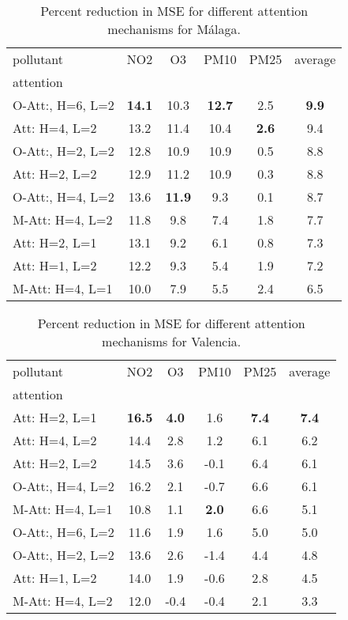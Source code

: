 \begin{table}
\begin{center}
\begin{tabular}{lccccc}
\toprule
pollutant & NO2 & O3 & PM10 & PM25 & average \\
attention &  &  &  &  &  \\
\midrule
O-Att:, H=6, L=2 & \textbf{14.1} & 10.3 & \textbf{12.7} & 2.5 & \textbf{9.9} \\
Att: H=4, L=2 & 13.2 & 11.4 & 10.4 & \textbf{2.6} & 9.4 \\
O-Att:, H=2, L=2 & 12.8 & 10.9 & 10.9 & 0.5 & 8.8 \\
Att: H=2, L=2 & 12.9 & 11.2 & 10.9 & 0.3 & 8.8 \\
O-Att:, H=4, L=2 & 13.6 & \textbf{11.9} & 9.3 & 0.1 & 8.7 \\
M-Att: H=4, L=2 & 11.8 & 9.8 & 7.4 & 1.8 & 7.7 \\
Att: H=2, L=1 & 13.1 & 9.2 & 6.1 & 0.8 & 7.3 \\
Att: H=1, L=2 & 12.2 & 9.3 & 5.4 & 1.9 & 7.2 \\
M-Att: H=4, L=1 & 10.0 & 7.9 & 5.5 & 2.4 & 6.5 \\
\bottomrule
\end{tabular}
\end{center}
\caption{Percent reduction in MSE for different attention mechanisms for Málaga.}
\label{tab:MSEGainByCityMalaga}
\end{table}



\begin{table}
\begin{center}
\begin{tabular}{lccccc}
\toprule
pollutant & NO2 & O3 & PM10 & PM25 & average \\
attention &  &  &  &  &  \\
\midrule
Att: H=2, L=1 & \textbf{16.5} & \textbf{4.0} & 1.6 & \textbf{7.4} & \textbf{7.4} \\
Att: H=4, L=2 & 14.4 & 2.8 & 1.2 & 6.1 & 6.2 \\
Att: H=2, L=2 & 14.5 & 3.6 & -0.1 & 6.4 & 6.1 \\
O-Att:, H=4, L=2 & 16.2 & 2.1 & -0.7 & 6.6 & 6.1 \\
M-Att: H=4, L=1 & 10.8 & 1.1 & \textbf{2.0} & 6.6 & 5.1 \\
O-Att:, H=6, L=2 & 11.6 & 1.9 & 1.6 & 5.0 & 5.0 \\
O-Att:, H=2, L=2 & 13.6 & 2.6 & -1.4 & 4.4 & 4.8 \\
Att: H=1, L=2 & 14.0 & 1.9 & -0.6 & 2.8 & 4.5 \\
M-Att: H=4, L=2 & 12.0 & -0.4 & -0.4 & 2.1 & 3.3 \\
\bottomrule
\end{tabular}
\end{center}
\caption{Percent reduction in MSE for different attention mechanisms for Valencia.}
\label{tab:MSEGainByCityValencia}
\end{table}




